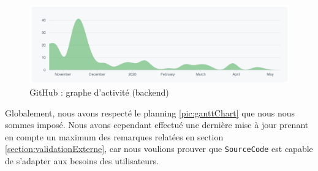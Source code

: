 \begin{figure}[H]
    \includegraphics[width=\textwidth,height=0.3\textheight,keepaspectratio]{images/analyseCritique/graph_backend.png}
    \centering
    \caption{GitHub : graphe d'activité (backend)}
    \label{figure:backendActivity}
\end{figure}


Globalement, nous avons respecté le planning \ref{pic:ganttChart} que nous nous sommes imposé. Nous avons cependant effectué une dernière mise à jour prenant en compte un maximum des remarques relatées en section \ref{section:validationExterne}, car nous voulions prouver que \texttt{SourceCode} est capable de s'adapter aux besoins des utilisateurs.
